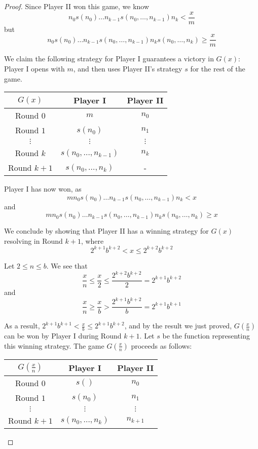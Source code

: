 \documentclass[11pt]{article}
\theoremstyle{plain}
\theoremstyle{definition}
\theoremstyle{remark}
\newcommand{\<}{\langle}
\renewcommand{\>}{\rangle}
\begin{document}
\begin{proof}
Since Player II won this game, we know 
  \[
    n_0s(n_0)\dots n_{k-1}s(n_0,\dots,n_{k-1})n_k < \frac{x}{m}
  \]
but 
  \[
    n_0s(n_0)\dots n_{k-1}s(n_0,\dots,n_{k-1})n_ks(n_0,\dots,n_k) \geq \frac{x}{m}
  \]

We claim the following strategy for Player I guarantees a victory in $G(x)$: Player I opens with $m$, and then uses Player II's strategy $s$ for the rest of the game.

\begin{center}\begin{tabular}{c|c|c}
$G(x)$ & Player I & Player II \\\hline
Round $0$ & $m$ & $n_0$ \\\hline
Round $1$ & $s(n_0)$ & $n_1$ \\\hline
$\vdots$ & $\vdots$ & $\vdots$ \\\hline
Round $k$ & $s(n_0,\dots,n_{k-1})$ & $n_k$ \\\hline
Round $k+1$ & $s(n_0,\dots,n_k)$ & -
\end{tabular}\end{center}

Player I has now won, as
  \[
    mn_0s(n_0)\dots n_{k-1}s(n_0,\dots,n_{k-1})n_k < x
  \]
and 
  \[
    mn_0s(n_0)\dots n_{k-1}s(n_0,\dots,n_{k-1})n_ks(n_0,\dots,n_k) \geq x
  \]

We conclude by showing that Player II has a winning strategy for $G(x)$ resolving in Round $k+1$, where
  \[
    2^{k+1}b^{k+2} < x  \leq 2^{k+2}b^{k+2}
  \]

Let $2 \leq n \leq b$. We see that
  \[
    \frac{x}{n} \leq
    \frac{x}{2} \leq
    \frac{2^{k+2}b^{k+2}}{2} =
    2^{k+1}b^{k+2}
  \]
and
  \[
    \frac{x}{n} \geq
    \frac{x}{b} >
    \frac{2^{k+1}b^{k+2}}{b} =
    2^{k+1}b^{k+1}
  \]

As a result, $2^{k+1}b^{k+1} < \frac{x}{b} \leq 2^{k+1}b^{k+2}$, and by the result we just proved, $G(\frac{x}{n})$ can be won by Player I during Round $k+1$. Let $s$ be the function representing this winning strategy. The game $G(\frac{x}{n})$ proceeds as follows:

\begin{center}\begin{tabular}{c|c|c}
$G(\frac{x}{n})$ & Player I & Player II \\\hline
Round $0$ & $s()$ & $n_0$ \\\hline
Round $1$ & $s(n_0)$ & $n_1$ \\\hline
$\vdots$ & $\vdots$ & $\vdots$ \\\hline
Round $k+1$ & $s(n_0,\dots,n_k)$ & $n_{k+1}$
\end{tabular}\end{center}


\end{proof}
\end{document}
